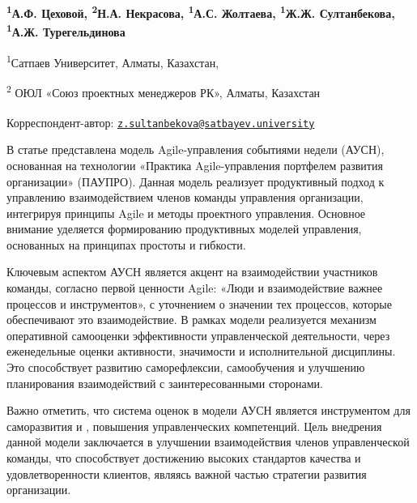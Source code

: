 
\begin{articleheader}

{\bfseries \textsuperscript{1}А.Ф. Цеховой, \textsuperscript{2}Н.А.
Некрасова, \textsuperscript{1}А.С. Жолтаева, \textsuperscript{1}Ж.Ж.
Султанбекова\textsuperscript{\envelope }, \textsuperscript{1}А.Ж. Турегельдинова}
\end{articleheader}
\begin{affiliation}

\textsuperscript{1}Сатпаев Университет, Алматы, Казахстан,

\textsuperscript{2} ОЮЛ «Союз проектных менеджеров РК», Алматы,
Казахстан

\raggedright{\bfseries \textsuperscript{\envelope }}Корреспондент-автор: \href{mailto:z.sultanbekova@satbayev.university}{\nolinkurl{z.sultanbekova@satbayev.university}}
\end{affiliation}

В статье представлена модель Agile-управления событиями недели (АУСН),
основанная на технологии «Практика Agile-управления портфелем развития
организации» (ПАУПРО). Данная модель реализует продуктивный подход к
управлению взаимодействием членов команды управления организации,
интегрируя принципы Agile и методы проектного управления. Основное
внимание уделяется формированию продуктивных моделей управления,
основанных на принципах простоты и гибкости.

Ключевым аспектом АУСН является акцент на взаимодействии участников
команды, согласно первой ценности Agile: «Люди и взаимодействие важнее
процессов и инструментов», с уточнением о значении тех процессов,
которые обеспечивают это взаимодействие. В рамках модели реализуется
механизм оперативной самооценки эффективности управленческой
деятельности, через еженедельные оценки активности, значимости и
исполнительной дисциплины. Это способствует развитию саморефлексии,
самообучения и улучшению планирования взаимодействий с заинтересованными
сторонами.

Важно отметить, что система оценок в модели АУСН является инструментом
для саморазвития и , повышения управленческих компетенций. Цель
внедрения данной модели заключается в улучшении взаимодействия членов
управленческой команды, что способствует достижению высоких стандартов
качества и удовлетворенности клиентов, являясь важной частью стратегии
развития организации.

